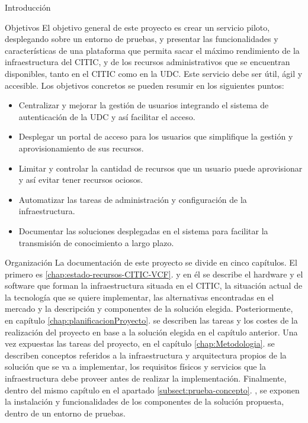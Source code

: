 \begin{chapter}{Introducción}
\begin{section}{Objetivos}
El objetivo general de este proyecto es crear un servicio piloto, desplegando sobre un entorno de pruebas, y presentar las funcionalidades y características de una plataforma que permita sacar el máximo rendimiento de la infraestructura del CITIC, y de los recursos administrativos que se encuentran disponibles, tanto en el CITIC como en la UDC. Este servicio debe ser útil, ágil y accesible.
Los objetivos concretos se pueden resumir en los siguientes puntos:
\begin{itemize}
    \item Centralizar y mejorar la gestión de usuarios integrando el sistema de autenticación de la UDC y así facilitar el acceso.
    \item Desplegar un portal de acceso para los usuarios que simplifique la gestión y aprovisionamiento de sus recursos.
    \item Limitar y controlar la cantidad de recursos que un usuario puede aprovisionar y así evitar tener recursos ociosos.
    \item Automatizar las tareas de administración y configuración de la infraestructura.
    \item Documentar las soluciones desplegadas en el sistema para facilitar la transmisión de conocimiento a largo plazo.
\end{itemize}
\end{section}

\begin{section}{Organización}
    La documentación de este proyecto se divide en cinco capítulos. El primero es \ref{chap:estado-recursos-CITIC-VCF}. y en él se describe el hardware y el software que forman la infraestructura situada en el CITIC, la situación actual de la tecnología que se quiere implementar, las alternativas encontradas en el mercado y la descripción y componentes de la solución elegida. Posteriormente, en capítulo \ref{chap:planificacionProyecto}. se describen las tareas y los costes de la realización del proyecto en base a la solución elegida en el capítulo anterior. Una vez expuestas las tareas del proyecto, en el capítulo \ref{chap:Metodologia}. se describen conceptos referidos a la infraestructura y arquitectura propios de la solución que se va a implementar, los requisitos físicos y servicios que la infraestructura debe proveer antes de realizar la implementación. Finalmente, dentro del mismo capítulo en el apartado \ref{subsect:prueba-concepto}. , se exponen la instalación y funcionalidades de los componentes de la solución propuesta, dentro de un entorno de pruebas.
\end{section}

\end{chapter}